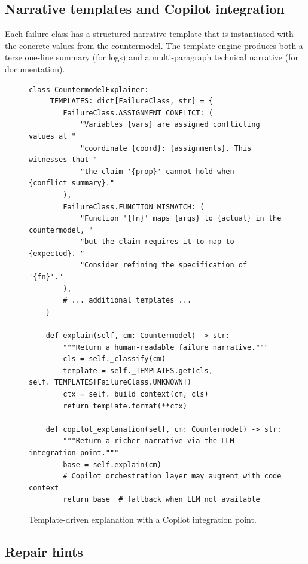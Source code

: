 \documentclass[11pt]{article}
\begin{document}
\subsection{Narrative templates and Copilot integration}

Each failure class has a structured narrative template that is
instantiated with the concrete values from the countermodel.  The
template engine produces both a terse one-line summary (for logs) and
a multi-paragraph technical narrative (for documentation).

\begin{figure}[ht]
\begin{lstlisting}[style=jugeo-python]
class CountermodelExplainer:
    _TEMPLATES: dict[FailureClass, str] = {
        FailureClass.ASSIGNMENT_CONFLICT: (
            "Variables {vars} are assigned conflicting values at "
            "coordinate {coord}: {assignments}. This witnesses that "
            "the claim '{prop}' cannot hold when {conflict_summary}."
        ),
        FailureClass.FUNCTION_MISMATCH: (
            "Function '{fn}' maps {args} to {actual} in the countermodel, "
            "but the claim requires it to map to {expected}. "
            "Consider refining the specification of '{fn}'."
        ),
        # ... additional templates ...
    }

    def explain(self, cm: Countermodel) -> str:
        """Return a human-readable failure narrative."""
        cls = self._classify(cm)
        template = self._TEMPLATES.get(cls, self._TEMPLATES[FailureClass.UNKNOWN])
        ctx = self._build_context(cm, cls)
        return template.format(**ctx)

    def copilot_explanation(self, cm: Countermodel) -> str:
        """Return a richer narrative via the LLM integration point."""
        base = self.explain(cm)
        # Copilot orchestration layer may augment with code context
        return base  # fallback when LLM not available
\end{lstlisting}
\caption{Template-driven explanation with a Copilot integration point.}
\label{fig:explainer}
\end{figure}

\subsection{Repair hints}
\end{document}
